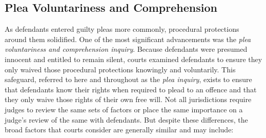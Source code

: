 \subsection{Plea Voluntariness and Comprehension}

As defendants entered guilty pleas more commonly, procedural protections around them solidified. One of the most significant advancements was the \textit{plea voluntariness and comprehension inquiry}. Because defendants were presumed innocent and entitled to remain silent, courts examined defendants to ensure they only waived those procedural protections knowingly and voluntarily. This safeguard, referred to here and throughout as the \textit{plea inquiry}, exists to ensure that defendants know their rights when required to plead to an offence and that they only waive those rights of their own free will. Not all jurisdictions require judges to review the same sets of factors or place the same importance on a judge's review of the same with defendants. But despite these differences, the broad factors that courts consider are generally similar and may include:

